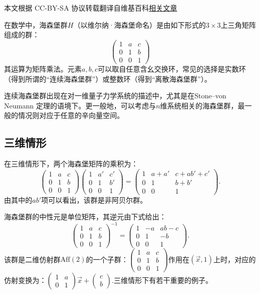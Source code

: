 
本文根据 CC-BY-SA 协议转载翻译自维基百科\href{https://en.wikipedia.org/wiki/Heisenberg_group}{相关文章}

在数学中，海森堡群$H$（以维尔纳·海森堡命名）是由如下形式的$3 \times 3$上三角矩阵组成的群：
$$
\begin{pmatrix}
1 & a & c \\
0 & 1 & b \\
0 & 0 & 1
\end{pmatrix}~
$$
其运算为矩阵乘法。元素$a, b, c$可以取自任意含幺交换环，常见的选择是实数环（得到所谓的“连续海森堡群”）或整数环（得到“离散海森堡群”）。

连续海森堡群出现在对一维量子力学系统的描述中，尤其是在Stone–von Neumann 定理的语境下。更一般地，可以考虑与$n$维系统相关的海森堡群，最一般的情况则对应于任意的辛向量空间。
\subsection{三维情形}
在三维情形下，两个海森堡矩阵的乘积为：
$$
\begin{pmatrix}
1 & a & c \\
0 & 1 & b \\
0 & 0 & 1
\end{pmatrix}
\begin{pmatrix}
1 & a' & c' \\
0 & 1 & b' \\
0 & 0 & 1
\end{pmatrix}
=
\begin{pmatrix}
1 & a + a' & c + ab' + c' \\
0 & 1 & b + b' \\
0 & 0 & 1
\end{pmatrix}.~
$$
由其中的$ab'$项可以看出，该群是非阿贝尔群。

海森堡群的中性元是单位矩阵，其逆元由下式给出：
$$
\begin{pmatrix}
1 & a & c \\
0 & 1 & b \\
0 & 0 & 1
\end{pmatrix}^{-1}
=
\begin{pmatrix}
1 & -a & ab - c \\
0 & 1 & -b \\
0 & 0 & 1
\end{pmatrix}.~
$$
该群是二维仿射群$\mathrm{Aff}(2)$的一个子群：$\begin{pmatrix}1 & a & c \\0 & 1 & b \\0 & 0 & 1\end{pmatrix}$作用在$(\vec{x}, 1)$上时，对应的仿射变换为：$\begin{pmatrix}1 & a \\0 & 1\end{pmatrix} \vec{x} +\begin{pmatrix}c \\b\end{pmatrix}$.三维情形下有若干重要的例子。
